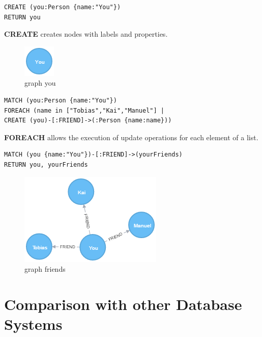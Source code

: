 \begin{lstlisting}[frame=single, caption=Create a Record, label=gcar]
CREATE (you:Person {name:"You"})
RETURN you
\end{lstlisting}
\textbf{CREATE} creates nodes with labels and properties.

\begin{figure}[H]
	\begin{center}
		\includegraphics[keepaspectratio]{images/neo4j/you.png}
		\caption{graph you}
	\end{center}
\end{figure}

\begin{lstlisting}[frame=single, caption=Create Relations, label=gcrl]
MATCH (you:Person {name:"You"})
FOREACH (name in ["Tobias","Kai","Manuel"] |
CREATE (you)-[:FRIEND]->(:Person {name:name}))
\end{lstlisting}
\textbf{FOREACH} allows the execution of update operations for each element of a list.

\begin{lstlisting}[frame=single, caption=Show Relations, label=gshrl]
MATCH (you {name:"You"})-[:FRIEND]->(yourFriends)
RETURN you, yourFriends
\end{lstlisting}

\begin{figure}[H]
	\begin{center}
		\includegraphics[keepaspectratio]{images/neo4j/friends.png}
		\caption{graph friends}
	\end{center}
\end{figure}

\section{Comparison with other Database Systems}

